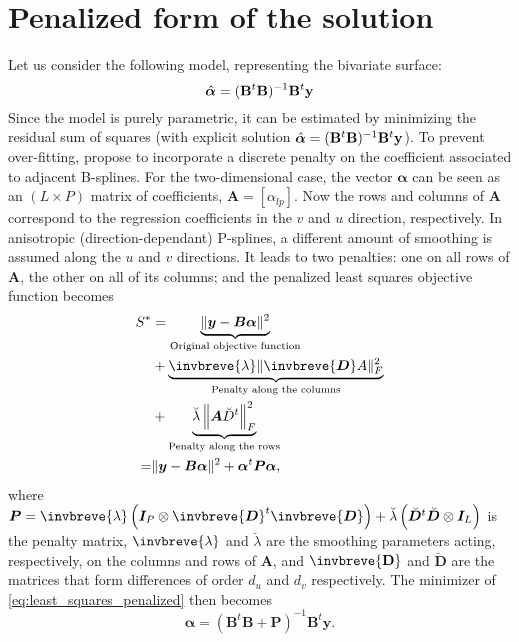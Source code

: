 \section{Penalized form of the solution}
\label{appendix:penalized_solution_form}
Let us consider the following model, representing the bivariate surface:
\begin{equation}
	\Hat{\boldsymbol{\alpha}} = (\mathbf{B}^t\mathbf{B})^{-1}\mathbf{B}^t\mathbf{y}
\end{equation}
Since the model is purely parametric, it can be estimated by minimizing the residual sum of squares (with explicit solution $\Hat{\boldsymbol{\alpha}} = (\mathbf{B}^t\mathbf{B})^{-1}\mathbf{B}^t\mathbf{y}$). To prevent over-fitting, \textcite{eilers_flexible_1996} propose to incorporate a discrete penalty on the coefficient associated to adjacent B-splines. For the two-dimensional case, the vector $\boldsymbol{\alpha}$ can be seen as an  $(L \times P)$  matrix  of  coefficients, $\mathbf{A}=[\alpha_{lp}]$. Now the rows  and columns of $\mathbf{A}$ correspond to the regression coefficients in the $v$ and  $u$ direction, respectively. In anisotropic (direction-dependant) P-splines, a different amount of smoothing is assumed along the $u$ and $v$ directions. It leads to two penalties:  one on all rows of $\mathbf{A}$,  the other on all of its columns; and the penalized least squares objective function becomes \parencite{eilers_multivariate_2003}
\begin{equation}
\begin{aligned}
    S^{*} & = \underbrace{\|\boldsymbol{y}-\boldsymbol{B} \boldsymbol{\alpha}\|^{2}}_{\text{Original objective function}} \\
    	  & +\underbrace{\invbreve{\lambda}\|\invbreve{\boldsymbol{D}} A\|_{F}^{2}}_{\text{Penalty along the columns}} \\
    	  & +\underbrace{\breve{\lambda}\left\|\boldsymbol{A} \breve{D}^{t}\right\|_{F}^{2}}_{\text{Penalty along the rows}} \\
    =	  & \|\boldsymbol{y}-\boldsymbol{B} \boldsymbol{\alpha}\|^{2}+\boldsymbol{\alpha}^{t} \boldsymbol{P} \boldsymbol{\alpha}
    \text{,}
    \label{eq:least_squares_penalized}
\end{aligned}
\end{equation}
where $\boldsymbol{P}=\invbreve{\lambda}\left(\boldsymbol{I}_{P} \otimes \invbreve{\boldsymbol{D}}^{t} \invbreve{\boldsymbol{D}}\right)+\breve{\lambda}\left(\breve{\boldsymbol{D}}^{t} \breve{\boldsymbol{D}} \otimes \boldsymbol{I}_{L}\right)$ is the penalty matrix, $\invbreve{\lambda}$ and $\breve{\lambda}$ are the smoothing parameters acting, respectively, on the columns and rows of $\mathbf{A}$, and $\invbreve{\mathbf{D}}$ and $\breve{\mathbf{D}}$ are the matrices that form differences of order $d_u$ and $d_v$ respectively. The minimizer of \ref{eq:least_squares_penalized} then becomes 
\begin{equation}
    \widehat{\boldsymbol{\alpha}}=\left(\boldsymbol{B}^{t} \boldsymbol{B}+\boldsymbol{P}\right)^{-1} \boldsymbol{B}^{t} 
    \boldsymbol{y}
    \text{.}
\end{equation}

